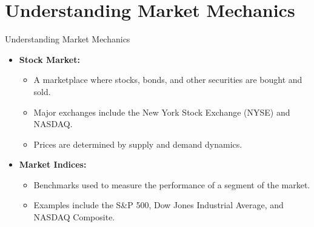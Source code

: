 \documentclass{beamer}
\begin{document}
\section{Understanding Market Mechanics}
\begin{frame}{Understanding Market Mechanics}
    \begin{itemize}
        \item \textbf{Stock Market:}
        \begin{itemize}
            \item A marketplace where stocks, bonds, and other securities are bought and sold.
            \item Major exchanges include the New York Stock Exchange (NYSE) and NASDAQ.
            \item Prices are determined by supply and demand dynamics.
        \end{itemize}
        \item \textbf{Market Indices:}
        \begin{itemize}
            \item Benchmarks used to measure the performance of a segment of the market.
            \item Examples include the S&P 500, Dow Jones Industrial Average, and NASDAQ Composite.
        \end{itemize}
    \end{itemize}
\end{frame}
\end{document}
